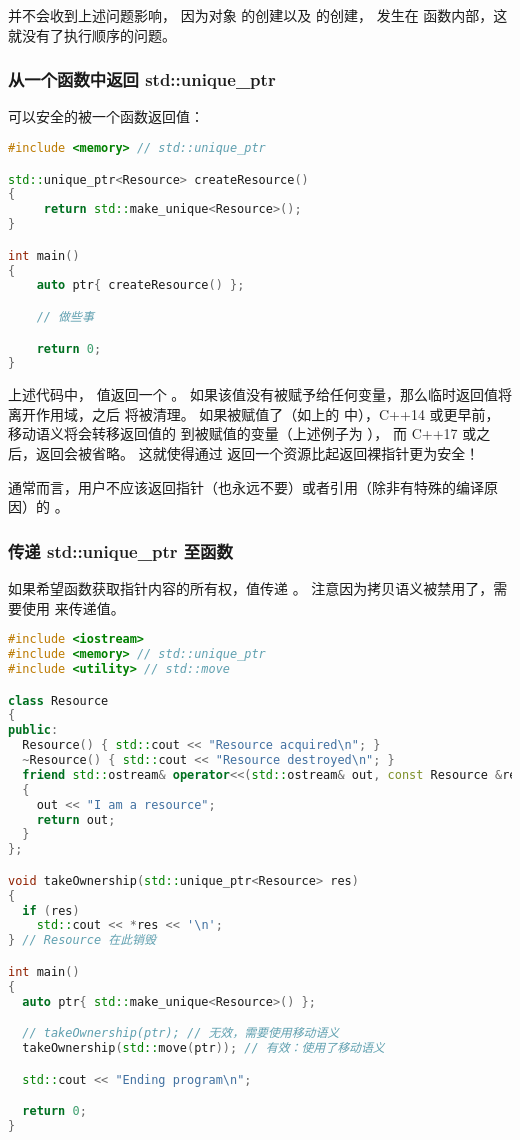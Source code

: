 \documentclass[../../LearnCpp.tex]{subfiles}
\begin{document}
 并不会收到上述问题影响，
因为对象  的创建以及  的创建，
发生在  函数内部，这就没有了执行顺序的问题。

\subsubsection*{从一个函数中返回 std::unique\_ptr}

 可以安全的被一个函数返回值：

\begin{lstlisting}[language=C++]
#include <memory> // std::unique_ptr

std::unique_ptr<Resource> createResource()
{
     return std::make_unique<Resource>();
}

int main()
{
    auto ptr{ createResource() };

    // 做些事

    return 0;
}
\end{lstlisting}

上述代码中， 值返回一个 。
如果该值没有被赋予给任何变量，那么临时返回值将离开作用域，之后  将被清理。
如果被赋值了（如上的  中），C++14 或更早前，
移动语义将会转移返回值的  到被赋值的变量（上述例子为 ），
而 C++17 或之后，返回会被省略。
这就使得通过  返回一个资源比起返回裸指针更为安全！

通常而言，用户不应该返回指针（也永远不要）或者引用（除非有特殊的编译原因）的  。

\subsubsection*{传递 std::unique\_ptr 至函数}

如果希望函数获取指针内容的所有权，值传递 。
注意因为拷贝语义被禁用了，需要使用  来传递值。

\begin{lstlisting}[language=C++]
#include <iostream>
#include <memory> // std::unique_ptr
#include <utility> // std::move

class Resource
{
public:
  Resource() { std::cout << "Resource acquired\n"; }
  ~Resource() { std::cout << "Resource destroyed\n"; }
  friend std::ostream& operator<<(std::ostream& out, const Resource &res)
  {
    out << "I am a resource";
    return out;
  }
};

void takeOwnership(std::unique_ptr<Resource> res)
{
  if (res)
    std::cout << *res << '\n';
} // Resource 在此销毁

int main()
{
  auto ptr{ std::make_unique<Resource>() };

  // takeOwnership(ptr); // 无效，需要使用移动语义
  takeOwnership(std::move(ptr)); // 有效：使用了移动语义

  std::cout << "Ending program\n";

  return 0;
}
\end{lstlisting}
\end{document}
